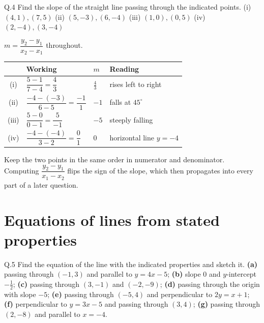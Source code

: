 \begin{question}{Q.4}
Find the slope of the straight line passing through the indicated points.
(i) $(4,1),(7,5)$ \quad (ii) $(5,-3),(6,-4)$ \quad
(iii) $(1,0),(0,5)$ \quad (iv) $(2,-4),(3,-4)$
\end{question}

\begin{solution}
$m=\dfrac{y_2-y_1}{x_2-x_1}$ throughout.

\begin{center}
\small\sffamily
\begin{tabular}{@{}c L{5.2cm} C{2.0cm} L{5.0cm}@{}}
\toprule
 & Working & $m$ & Reading \\
\midrule
(i)   & $\dfrac{5-1}{7-4}=\dfrac{4}{3}$      & $\tfrac43$ & rises left to right \\
(ii)  & $\dfrac{-4-(-3)}{6-5}=\dfrac{-1}{1}$ & $-1$       & falls at $45^{\circ}$ \\
(iii) & $\dfrac{5-0}{0-1}=\dfrac{5}{-1}$     & $-5$       & steeply falling \\
(iv)  & $\dfrac{-4-(-4)}{3-2}=\dfrac{0}{1}$  & $0$        & horizontal line $y=-4$ \\
\bottomrule
\end{tabular}
\end{center}

\end{solution}

\begin{pitfall}
Keep the two points in the same order in numerator and denominator. Computing
$\dfrac{y_2-y_1}{x_1-x_2}$ flips the sign of the slope, which then propagates
into every part of a later question.
\end{pitfall}

\section{Equations of lines from stated properties}

\begin{question}{Q.5}
Find the equation of the line with the indicated properties and sketch it.
\textbf{(a)} passing through $(-1,3)$ and parallel to $y=4x-5$;
\textbf{(b)} slope 0 and $y$-intercept $-\tfrac12$;
\textbf{(c)} passing through $(3,-1)$ and $(-2,-9)$;
\textbf{(d)} passing through the origin with slope $-5$;
\textbf{(e)} passing through $(-5,4)$ and perpendicular to $2y=x+1$;
\textbf{(f)} perpendicular to $y=3x-5$ and passing through $(3,4)$;
\textbf{(g)} passing through $(2,-8)$ and parallel to $x=-4$.
\end{question}

